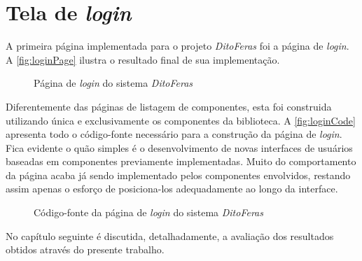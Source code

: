 \section{Tela de \textit{login}}
\label{sec:telaLogin}

A primeira página implementada para o projeto \textit{DitoFeras} foi a página de \textit{login}. A \autoref{fig:loginPage} ilustra o resultado final de sua implementação.

\begin{figure}
  \begin{center}
	\end{center}
  \caption{Página de \textit{login} do sistema \textit{DitoFeras}}
  \label{fig:loginPage}
\end{figure}

Diferentemente das páginas de listagem de componentes, esta foi construida utilizando única e exclusivamente os componentes da biblioteca. A \autoref{fig:loginCode} apresenta todo o código-fonte necessário para a construção da página de \textit{login}. Fica evidente o quão simples é o desenvolvimento de novas interfaces de usuários baseadas em componentes previamente implementadas. Muito do comportamento da página acaba já sendo implementado pelos componentes envolvidos, restando assim apenas o esforço de posiciona-los adequadamente ao longo da interface.

\begin{figure}
  \begin{center}
	\end{center}
  \caption{Código-fonte da página de \textit{login} do sistema \textit{DitoFeras}}
  \label{fig:loginCode}
\end{figure}

No capítulo seguinte é discutida, detalhadamente, a avaliação dos resultados obtidos através do presente trabalho.
